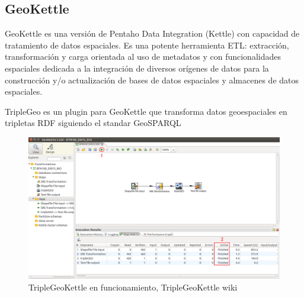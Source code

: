 \subsection{GeoKettle}

GeoKettle es una versión de Pentaho Data Integration (Kettle)\cite{pentaho} con capacidad de tratamiento de datos
espaciales. Es una potente herramienta ETL: extracción, transformación y carga orientada al uso de metadatos y
con funcionalidades espaciales dedicada a la integración de diversos orígenes de datos para la construcción y/o
actualización de bases de datos espaciales y almacenes de datos espaciales. \cite{geokettle-osg}

TripleGeo es un plugin para GeoKettle que transforma datos geoespaciales en tripletas RDF siguiendo el standar
GeoSPARQL \cite{triplegeo}

\begin{figure}[h]
    \includegraphics[width=\textwidth]{images/kettle.png}
    \centering
    \caption{TripleGeoKettle en funcionamiento, TripleGeoKettle wiki}
    \label{fig:kettle}
\end{figure}


